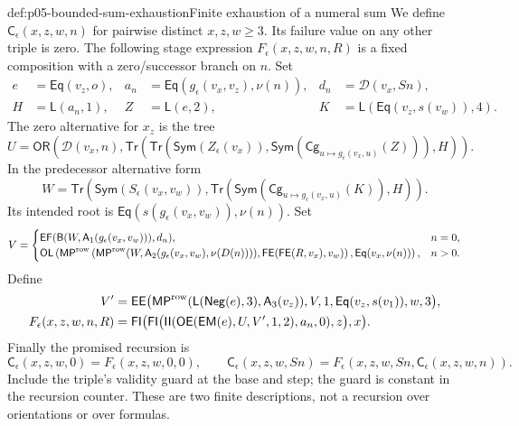 \begin{hbdefinition}{def:p05-bounded-sum-exhaustion}{Finite exhaustion of a numeral sum}
We define \(\mathsf C_\epsilon(x,z,w,n)\) for pairwise distinct
\(x,z,w\geq3\). Its failure value on any other triple is zero. The
following stage expression \(F_\epsilon(x,z,w,n,R)\) is a fixed
composition with a zero/successor branch on \(n\). Set
\[
\begin{aligned}
 e&=\mathsf{Eq}(v_z,o),&
 a_n&=\mathsf{Eq}(g_\epsilon(v_x,v_z),\nu(n)),&
 d_n&=\mathcal D(v_x,Sn),\\
 H&=\mathsf L(a_n,1),& Z&=\mathsf L(e,2),&
 K&=\mathsf L(\mathsf{Eq}(v_z,s(v_w)),4).
\end{aligned}
\]
The zero alternative for \(x_z\) is the tree
\[
 U=\mathsf{OR}\left(\mathcal D(v_x,n),
   \mathsf{Tr}\left(
    \mathsf{Tr}(\mathsf{Sym}(Z_\epsilon(v_x)),
      \mathsf{Sym}(\mathsf{Cg}_{u\mapsto g_\epsilon(v_x,u)}(Z))),H\right)\right).
\]
In the predecessor alternative form
\[
 W=\mathsf{Tr}\left(\mathsf{Sym}(S_\epsilon(v_x,v_w)),
       \mathsf{Tr}(\mathsf{Sym}
           (\mathsf{Cg}_{u\mapsto g_\epsilon(v_x,u)}(K)),H)\right).
\]
Its intended root is
\(\mathsf{Eq}(s(g_\epsilon(v_x,v_w)),\nu(n))\). Set
\[
 V=\begin{cases}
  \mathsf{EF}(\mathsf B(W,\mathsf A_1(g_\epsilon(v_x,v_w))),d_n),&n=0,\\
  \mathsf{OL}\left(
    \mathsf{MP}^{\rm row}\left(
      \mathsf{MP}^{\rm row}(W,
          \mathsf A_2(g_\epsilon(v_x,v_w),\nu(D(n)))),
      \mathsf{FE}(\mathsf{FE}(R,v_x),v_w)\right),
                           \mathsf{Eq}(v_x,\nu(n))\right),&n>0.
 \end{cases}
\]
Define
\[
\begin{aligned}
 V'&=\mathsf{EE}\bigl(
    \mathsf{MP}^{\rm row}(\mathsf L(\mathsf{Neg}(e),3),\mathsf A_3(v_z)),
                 V,1,\mathsf{Eq}(v_z,s(v_1)),w,3\bigr),\\
 F_\epsilon(x,z,w,n,R)&=
  \mathsf{FI}\bigl(\mathsf{FI}\bigl(
   \mathsf{II}(\mathsf{OE}(\mathsf{EM}(e),U,V',1,2),a_n,0),z\bigr),x\bigr).
\end{aligned}
\]
Finally the promised recursion is
\[
 \mathsf C_\epsilon(x,z,w,0)=F_\epsilon(x,z,w,0,0),\qquad
 \mathsf C_\epsilon(x,z,w,Sn)
       =F_\epsilon(x,z,w,Sn,\mathsf C_\epsilon(x,z,w,n)).
\]
Include the triple's validity guard at the base and step; the guard is
constant in the recursion counter. These are two finite descriptions, not a
recursion over orientations or over formulas.
\end{hbdefinition}


